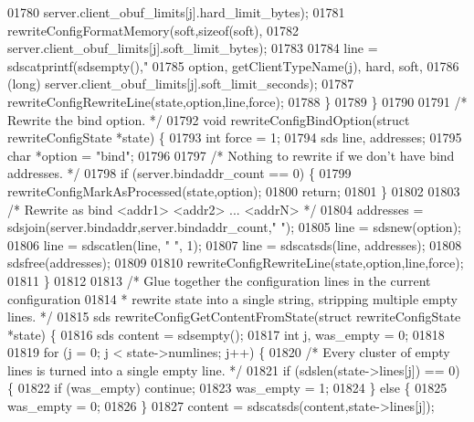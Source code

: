 \begin{DoxyCode}
{{{{{{{{{{{{{{{{{{{{{{{{{{01780                 server.client\_obuf\_limits[j].hard\_limit\_bytes);
01781         rewriteConfigFormatMemory(soft,\textcolor{keyword}{sizeof}(soft),
01782                 server.client\_obuf\_limits[j].soft\_limit\_bytes);
01783 
01784         line = sdscatprintf(sdsempty(),\textcolor{stringliteral}{"%
01785                 option, getClientTypeName(j), hard, soft,
01786                 (\textcolor{keywordtype}{long}) server.client\_obuf\_limits[j].soft\_limit\_seconds);
01787         rewriteConfigRewriteLine(state,option,line,force);
01788     \}
01789 \}
01790 
01791 \textcolor{comment}{/* Rewrite the bind option. */}
01792 \textcolor{keywordtype}{void} rewriteConfigBindOption(\textcolor{keyword}{struct} rewriteConfigState *state) \{
01793     \textcolor{keywordtype}{int} force = 1;
01794     sds line, addresses;
01795     \textcolor{keywordtype}{char} *option = \textcolor{stringliteral}{"bind"};
01796 
01797     \textcolor{comment}{/* Nothing to rewrite if we don't have bind addresses. */}
01798     \textcolor{keywordflow}{if} (server.bindaddr\_count == 0) \{
01799         rewriteConfigMarkAsProcessed(state,option);
01800         \textcolor{keywordflow}{return};
01801     \}
01802 
01803     \textcolor{comment}{/* Rewrite as bind <addr1> <addr2> ... <addrN> */}
01804     addresses = sdsjoin(server.bindaddr,server.bindaddr\_count,\textcolor{stringliteral}{" "});
01805     line = sdsnew(option);
01806     line = sdscatlen(line, \textcolor{stringliteral}{" "}, 1);
01807     line = sdscatsds(line, addresses);
01808     sdsfree(addresses);
01809 
01810     rewriteConfigRewriteLine(state,option,line,force);
01811 \}
01812 
01813 \textcolor{comment}{/* Glue together the configuration lines in the current configuration}
01814 \textcolor{comment}{ * rewrite state into a single string, stripping multiple empty lines. */}
01815 sds rewriteConfigGetContentFromState(\textcolor{keyword}{struct} rewriteConfigState *state) \{
01816     sds content = sdsempty();
01817     \textcolor{keywordtype}{int} j, was\_empty = 0;
01818 
01819     \textcolor{keywordflow}{for} (j = 0; j < state->numlines; j++) \{
01820         \textcolor{comment}{/* Every cluster of empty lines is turned into a single empty line. */}
01821         \textcolor{keywordflow}{if} (sdslen(state->lines[j]) == 0) \{
01822             \textcolor{keywordflow}{if} (was\_empty) \textcolor{keywordflow}{continue};
01823             was\_empty = 1;
01824         \} \textcolor{keywordflow}{else} \{
01825             was\_empty = 0;
01826         \}
01827         content = sdscatsds(content,state->lines[j]);
}}}}}}}}}}}}}}}}}}}}}}}}}}}
\end{DoxyCode}
